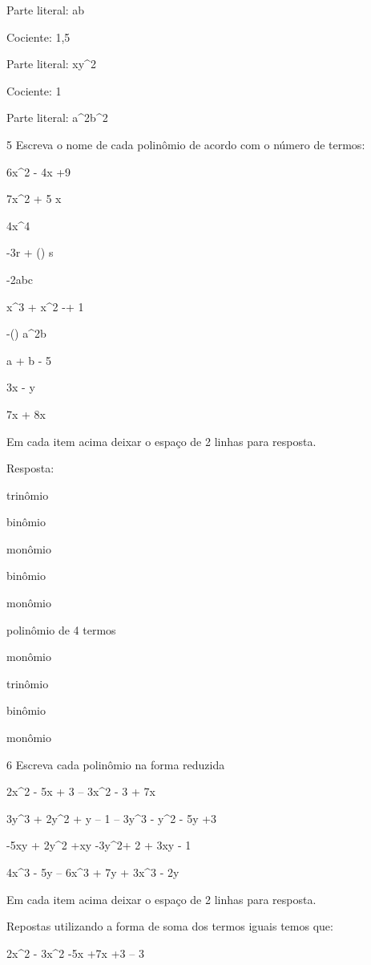 Parte literal: ab

\item Cociente: 1,5

Parte literal: xy^2

\item Cociente: 1

Parte literal: a^2b^2

\num{5} Escreva o nome de cada polinômio de acordo com o número de termos:

\item 6x^2 - 4x +9
\item 7x^2 + 5 x
\item 4x^4
\item -3r + () s
\item -2abc
\item x^3 + x^2 -\times + 1
\item -() a^2b
\item a + b - 5
\item 3x - y
\item 7x + 8x

Em cada item acima deixar o espaço de 2 linhas para resposta.

Resposta:

\item trinômio
\item binômio
\item monômio
\item binômio
\item monômio
\item polinômio de 4 termos
\item monômio
\item trinômio
\item binômio
\item monômio

\num{6} Escreva cada polinômio na forma reduzida

\item 2x^2 - 5x + 3 -- 3x^2 - 3 + 7x
\item 3y^3 + 2y^2 + y -- 1 -- 3y^3 - y^2 - 5y +3
\item -5xy + 2y^2 +xy -3y^2+ 2 + 3xy - 1
\item 4x^3 - 5y -- 6x^3 + 7y + 3x^3 - 2y

Em cada item acima deixar o espaço de 2 linhas para resposta.

Repostas utilizando a forma de soma dos termos iguais temos que:

\item 2x^2 - 3x^2 -5x +7x +3 -- 3

